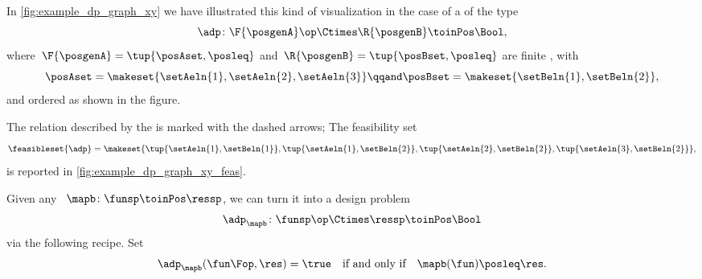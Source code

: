 \begin{marginfigure}
    \centering
    \caption{}
    \label{fig:example_dp_graph_xy}
\end{marginfigure}
\begin{marginfigure}
    \centering
    \caption{}
    \label{fig:example_dp_graph_xy_feas}
\end{marginfigure}

\begin{example}
    \label{exa:visualize-dp}
    In \cref{fig:example_dp_graph_xy} we have illustrated this kind of visualization in the case of a  of the type
    \begin{equation}
        \adp \colon \F{\posgenA} \op \Ctimes  \R{\posgenB} \toinPos \Bool,
    \end{equation}
    where~$\F{\posgenA} = \tup{\posAset, \posleq}$ and~$ \R{\posgenB} = \tup{\posBset, \posleq}$ are finite , with
    \begin{equation}
        \posAset = \makeset{ \setAeln{1}, \setAeln{2}, \setAeln{3} }
        \qqand
        \posBset =  \makeset{ \setBeln{1}, \setBeln{2}},
    \end{equation}
    and ordered as shown in the figure.

    The relation described by the  is marked with the dashed arrows;
    The feasibility set
    \begin{equation}
        \feasibleset{\adp} = \makeset{\tup{\setAeln{1}, \setBeln{1}}, \tup{\setAeln{1}, \setBeln{2}}, \tup{\setAeln{2}, \setBeln{2}}, \tup{\setAeln{3}, \setBeln{2}} },
    \end{equation}
    is reported in \cref{fig:example_dp_graph_xy_feas}.
\end{example}

\begin{remark}
    \label{re:dp-from-monotone}
    Given any ~$\mapb\colon \funsp \toinPos \ressp$, we can turn it into a design problem
    \begin{equation}
        \adp_\mapb \colon \funsp\op \Ctimes \ressp \toinPos \Bool
    \end{equation}
    via the following recipe.
    Set
    \begin{equation}
        \adp_\mapb (\fun\Fop, \res) = \true \quad \text{if and only if} \quad \mapb(\fun) \posleq \res.
    \end{equation}
\end{remark}

